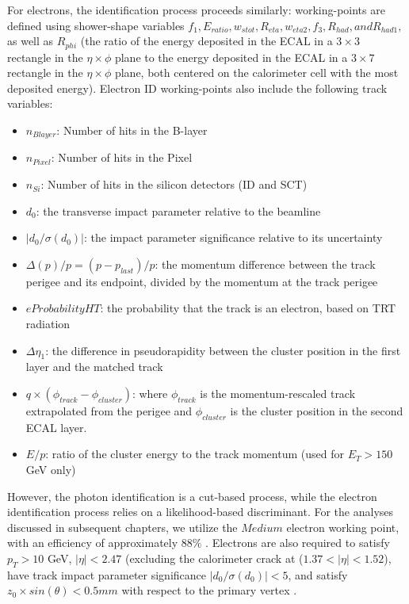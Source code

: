 For electrons, the identification process proceeds similarly: working-points are defined using shower-shape variables $f_{1}, E_{ratio}, w_{s tot}, R_{eta}, w_{eta2}, f_{3}, R_{had}, and R_{had1},$ as well as $R_{phi}$ (the ratio of the energy deposited in the ECAL in a $3 \times 3$ rectangle in the $\eta \times \phi$ plane to the energy deposited in the ECAL in a $3 \times 7$ rectangle in the $\eta \times \phi$ plane, both centered on the calorimeter cell with the most deposited energy). Electron ID working-points also include the following track variables:
\begin{itemize}
\item $n_{Blayer}$: Number of hits in the B-layer
\item $n_{Pixel}$: Number of hits in the Pixel
\item $n_{Si}$: Number of hits in the silicon detectors (ID and SCT)
\item $d_{0}$: the transverse impact parameter relative to the beamline
\item $|d_{0} / \sigma(d_{0})|$: the impact parameter significance relative to its uncertainty
\item $\Delta(p)/p = (p-p_{last})/p$: the momentum difference between the track perigee and its endpoint, divided by the momentum at the track perigee
\item $eProbabilityHT$: the probability that the track is an electron, based on TRT radiation
\item $\Delta \eta_{1}$: the difference in pseudorapidity between the cluster position in the first layer and the matched track
\item $q \times (\phi_{track}-\phi_{cluster})$: where $\phi_{track}$ is the momentum-rescaled track extrapolated from the perigee and $\phi_{cluster}$ is the cluster position in the second ECAL layer.
\item $E/p$: ratio of the cluster energy to the track momentum (used for $E_{T} > 150$ GeV only) 
\end{itemize}

However, the photon identification is a cut-based process, while the electron identification process relies on a likelihood-based discriminant. For the analyses discussed in subsequent chapters, we utilize the $Medium$ electron working point, with an efficiency of approximately 88$\%$ \cite{elID-CERN-EP-2018-273}. Electrons are also required to satisfy $p_{T} > 10$ GeV, $|\eta| < 2.47$ (excluding the calorimeter crack at ($1.37<|\eta|<1.52$), have track impact parameter significance $|d_{0} / \sigma(d_{0})| < 5$, and satisfy $z_{0} \times sin(\theta) < 0.5 mm$ with respect to the primary vertex \cite{ATL-COM-PHYS-2020-378}.

